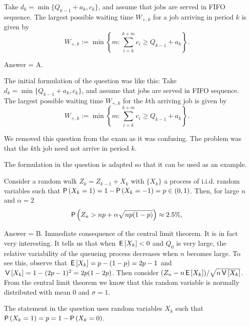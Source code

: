 \begin{exercise}[201902]
Take  $d_k = \min\{Q_{k-1}+a_k, c_k\}$, and assume that jobs are served in
  FIFO sequence. The  largest possible waiting time $W_{+, k}$ for a  job arriving in period $k$ is given by 
    \begin{equation*}
      W_{+,k}:= \min\left\{m: \sum_{i=k}^{k+m} c_i \geq
        Q_{k-1}+a_k\right\}.
    \end{equation*}

\begin{solution}
Answer = A.



The initial formulation of the question was like this: Take  $d_k = \min\{Q_{k-1}+a_k, c_k\}$, and assume that jobs are served in
  FIFO sequence. The  largest possible waiting time $W_{+, k}$ for the $k$th arriving job is given by 
    \begin{equation*}
      W_{+,k}:= \min\left\{m: \sum_{i=k}^{k+m} c_i \geq
        Q_{k-1}+a_k\right\}.
    \end{equation*}

    We  removed this question from the exam as it  was confusing. The problem was that the $k$th job need not arrive in period $k$.

    The formulation in the question is adapted so that it can be used as an example. 

\end{solution}
\end{exercise}

\begin{exercise}[201902]
  Consider a random walk $Z_k = Z_{k-1} + X_k$ with $\{X_k\}$ a process of i.i.d. random variables such that $\P{X_k=1} = 1-\P{X_k=-1} = p \in (0, 1)$. Then, for large $n$ and $\alpha = 2$
  \begin{equation*}
    \P{Z_n >  np + \alpha \sqrt{np(1-p)}} \approx 2.5\%, 
  \end{equation*}


\begin{solution}
Answer = B. Immediate consequence of the central limit theorem. It is in fact very interesting. It tells us that when $\,\mathsf{E}\left[X_k\right] < 0$ and $Q_0$ is very large, the relative variability of the queueing process decreases  when $n$ becomes large. To see this, observe that $\,\mathsf{E}\left[X_k\right] = p - (1-p)=2p-1$ and $\,\mathsf{V}\left[X_k\right] = 1 - (2p-1)^2 = 2p(1-2p)$. Then consider $(Z_n - n\,\mathsf{E}\left[X_k\right])/\sqrt{n\,\mathsf{V}\left[X_k\right]}$. From the central limit theorem we know that this random variable is normally distributed with mean 0 and $\sigma=1$. 

The statement in the question uses random variables $X_k$ such that $\P{X_k=1}=p = 1- \P{X_k=0}$. 
\end{solution}
\end{exercise}

